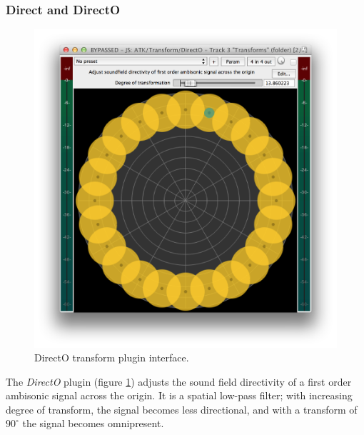\documentclass{article}
\begin{document}
\subsubsection{Direct and DirectO}\label{sec:direct}

\begin{figure}[h]
\captionsetup{aboveskip=-6pt}
\centering
\includegraphics[width=0.9\columnwidth]{figures/directOTransform.png}
\caption{DirectO transform plugin interface.\label{fig:directOTransform}}
\end{figure}

The \emph{DirectO} plugin (figure \ref{fig:directOTransform}) adjusts the sound field directivity of a first order ambisonic signal across the origin.
It is a spatial low-pass filter; with increasing degree of transform, the signal becomes less directional, and with a transform of $90^{\circ}$ the signal becomes omnipresent.
  
\end{document}
